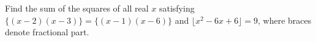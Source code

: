 Find the sum of the squares of all real $x$ satisfying $\{(x-2)(x-3)\}=\{(x-1)(x-6)\}$ and $\lfloor x^2-6x+6\rfloor=9$, where braces denote fractional part.
